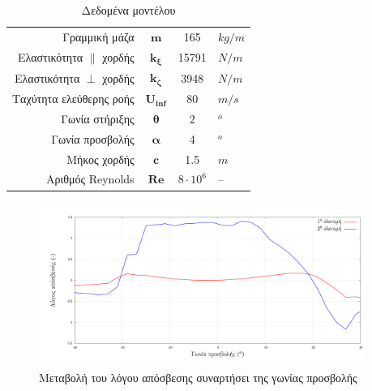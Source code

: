 \begin{table}[ht!]
    \begin{center}
        \begin{tabular}[c]{|r|c|c|l|}
            \hline
            Γραμμική μάζα & $\mathbf{m}$ & 165 & $kg/m$ \\
            Ελαστικότητα $\parallel$ χορδής & $\mathbf{k_{\xi}}$ & 15791 & $N/m$ \\
            Ελαστικότητα $\perp$ χορδής & $\mathbf{k_{\zeta}}$ & 3948 & $N/m$ \\
            Ταχύτητα ελεύθερης ροής & $\mathbf{U_{inf}}$ & 80 & $m/s$ \\
            Γωνία στήριξης & $\mathbf{\theta}$ & 2 & $^o$ \\
            Γωνία προσβολής & $\mathbf{\alpha}$ & 4 & $^o$ \\
            Μήκος χορδής & $\mathbf{c}$ & 1.5 & $m$ \\
            Αριθμός Reynolds & $\mathbf{Re}$ & $8\cdot 10^6$ & -- \\
            \hline
        \end{tabular}
    \caption{Δεδομένα μοντέλου}
    \label{tab:data}
    \end{center}
\end{table}

\begin{figure}
    \begin{center}
        \includegraphics[width=0.95\textwidth]{./figures/aoa_vs_damp.pdf}
    \end{center}
    \caption{Μεταβολή του λόγου απόσβεσης συναρτήσει της γωνίας προσβολής}
    \label{fig:damping}
\end{figure}

